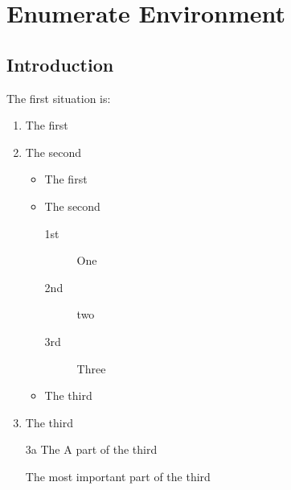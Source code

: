 \documentclass{article}
\begin{document}
    \section{Enumerate Environment}
        \subsection{Introduction}
            The first situation is: 
            \begin{enumerate}                                           %
                \item The first
                \item The second
                \begin{itemize}                                         %
                    \item The first
                    \item The second
                    \begin{description}                                 %
                        \item[1st] One
                        \item[2nd] two
                        \item[3rd] Three
                    \end{description}
                    \item The third
                \end{itemize}
                \item The third
                \item[3a] The A part of the third                       %
                \item[\dag] The most important part of the third        %
            \end{enumerate}
        
\end{document}
